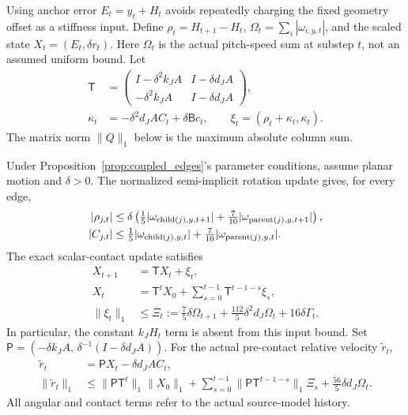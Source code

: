 Using anchor error $E_t=y_t+H_t$ avoids repeatedly charging the fixed geometry offset as a stiffness input.
Define $\rho_t=H_{t+1}-H_t$, $\Omega_t=\sum_i|\omega_{i,y,t}|$, and the scaled state $X_t=(E_t,\delta r_t)$.
Here $\Omega_t$ is the actual pitch-speed sum at substep $t$, not an assumed uniform bound.
Let
\begin{align}
 \mathsf T&=\begin{pmatrix}
 I-\delta^2k_JA&I-\delta d_JA\\
 -\delta^2k_JA&I-\delta d_JA
 \end{pmatrix},\nonumber\\
 \kappa_t&=-\delta^2d_JAC_t+\delta\mathsf Bc_t,
 \qquad \xi_t=(\rho_t+\kappa_t,\kappa_t).
 \label{eq:anchor_transient}
\end{align}
The matrix norm $\|Q\|_1$ below is the maximum absolute column sum.

\begin{proposition}
\label{prop:forced_response}
Under Proposition~\ref{prop:coupled_edges}'s parameter conditions, assume planar motion and $\delta>0$.
The normalized semi-implicit rotation update gives, for every edge,
\begin{align}
 |\rho_{j,t}|&\le\delta\left(\tfrac15|\omega_{{\rm child}(j),y,t+1}|+
       \tfrac7{10}|\omega_{{\rm parent}(j),y,t+1}|\right),\nonumber\\
 |C_{j,t}|&\le\tfrac15|\omega_{{\rm child}(j),y,t}|+
       \tfrac7{10}|\omega_{{\rm parent}(j),y,t}|.
 \label{eq:anchor_local_inputs}
\end{align}
The exact scalar-contact update satisfies
\begin{align}
 X_{t+1}&=\mathsf T X_t+\xi_t,\nonumber\\
 X_t&=\mathsf T^tX_0+\sum_{s=0}^{t-1}\mathsf T^{t-1-s}\xi_s,\nonumber\\
 \|\xi_t\|_1&\le\Xi_t:=\tfrac75\delta\Omega_{t+1}+
       \tfrac{112}5\delta^2d_J\Omega_t+16\delta\Gamma_t.
 \label{eq:anchor_forced_response}
\end{align}
In particular, the constant $k_JH_t$ term is absent from this input bound.
Set $\mathsf P=(-\delta k_JA,\,\delta^{-1}(I-\delta d_JA))$.
For the actual pre-contact relative velocity $\widetilde r_t$,
\begin{align}
 \widetilde r_t&=\mathsf P X_t-\delta d_JAC_t,\nonumber\\
 \|\widetilde r_t\|_1&\le\|\mathsf P\mathsf T^t\|_1\|X_0\|_1+
     \sum_{s=0}^{t-1}\|\mathsf P\mathsf T^{t-1-s}\|_1\Xi_s+
       \tfrac{56}5\delta d_J\Omega_t.
 \label{eq:anchor_pre_speed_bound}
\end{align}
All angular and contact terms refer to the actual source-model history.
\end{proposition}

